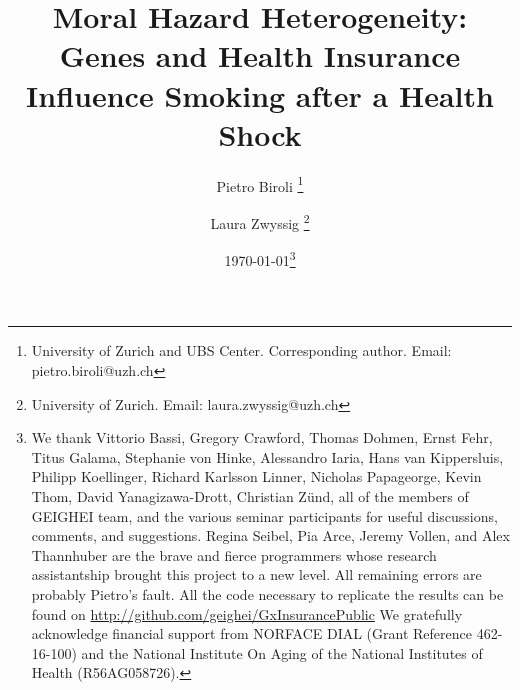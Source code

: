 \documentclass[11pt]{article}
\begin{document}
\title{
Moral Hazard Heterogeneity: \\ Genes and Health Insurance Influence Smoking after a Health Shock
}

\author{
Pietro Biroli \thanks{University of Zurich and UBS Center. Corresponding author. {Email: pietro.biroli@uzh.ch}}
\and
Laura Zwyssig \thanks{University of Zurich. Email: laura.zwyssig@uzh.ch}
} %

\date{
\today \thanks{
We thank
Vittorio Bassi,
Gregory Crawford,
Thomas Dohmen,
Ernst Fehr,
Titus Galama,
Stephanie von Hinke,
Alessandro Iaria,
Hans van Kippersluis,
Philipp Koellinger,
Richard Karlsson Linner,
Nicholas Papageorge,
Kevin Thom,
David Yanagizawa-Drott,
Christian Z\"und,
all of the members of GEIGHEI team, and the various seminar participants for useful discussions, comments, and suggestions.
Regina Seibel, Pia Arce, Jeremy Vollen, and Alex Thannhuber are the brave and fierce programmers whose research assistantship brought this project to a new level.
All remaining errors are probably Pietro's fault.
All the code necessary to replicate the results can be found on \url{http://github.com/geighei/GxInsurancePublic}
We gratefully acknowledge financial support from NORFACE DIAL (Grant Reference 462-16-100) and the National Institute On Aging of the National Institutes of Health (R56AG058726).
} %
} %

\maketitle
\end{document}
